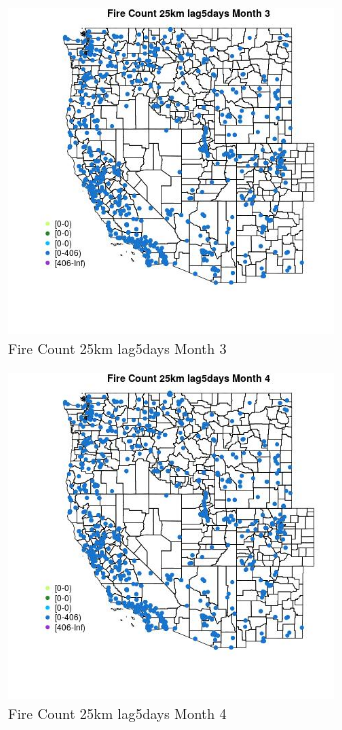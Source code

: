 \begin{figure} 
\centering  
\includegraphics[width=0.77\textwidth]{Code_Outputs/Report_ML_input_PM25_Step4_part_f_de_duplicated_aveswNAs_MapObsMo3Fire_Count_25km_lag5days.jpg} 
\caption{\label{fig:Report_ML_input_PM25_Step4_part_f_de_duplicated_aveswNAsMapObsMo3Fire_Count_25km_lag5days}Fire Count 25km lag5days Month 3} 
\end{figure} 
 

\begin{figure} 
\centering  
\includegraphics[width=0.77\textwidth]{Code_Outputs/Report_ML_input_PM25_Step4_part_f_de_duplicated_aveswNAs_MapObsMo4Fire_Count_25km_lag5days.jpg} 
\caption{\label{fig:Report_ML_input_PM25_Step4_part_f_de_duplicated_aveswNAsMapObsMo4Fire_Count_25km_lag5days}Fire Count 25km lag5days Month 4} 
\end{figure} 
 

